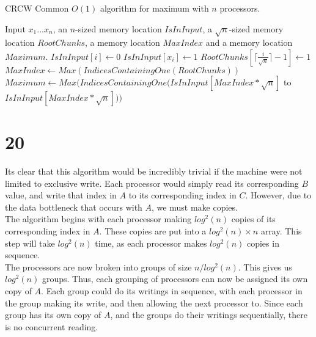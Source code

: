 \documentclass[letterpaper,notitlepage,twoside]{article}
\begin{document}
\begin{algorithm}[H]
  \begin{algorithmic}%
    \caption{CRCW Common $O(1)$ algorithm for maximum with $n$ processors.}
    \Require Input $x_1...x_n$, an $n$-sized memory location $IsInInput$, a $\sqrt{n}$-sized memory location $RootChunks$, a memory location $MaxIndex$ and a memory location $Maximum$.
    \State $IsInInput[i] \gets 0$ 
    \State $IsInInput[x_i] \gets 1$ 
        \State $RootChunks[\lceil \frac{i}{\sqrt{n}} \rceil -1] \gets 1$ 
    \EndIf
    \State $MaxIndex \gets Max(IndicesContainingOne(RootChunks))$ 
    \State $Maximum \gets Max(IndicesContainingOne(IsInInput[MaxIndex*\sqrt{n}]$ to $IsInInput[MaxIndex*\sqrt{n}]))$
  \end{algorithmic}
\end{algorithm}

\section*{20}
Its clear that this algorithm would be incredibly trivial if the machine were not limited to exclusive write. Each processor would simply read its corresponding $B$ value, and write that index in $A$ to its corresponding index in $C$. However, due to the data bottleneck that occurs with $A$, we must make copies. \\
The algorithm begins with each processor making $log^2(n)$ copies of its corresponding index in $A$. These copies are put into a $log^2(n) \times n$ array. This step will take $log^2(n)$ time, as each processor makes $log^2(n)$ copies in sequence. \\
The processors are now broken into groups of size $n/log^2(n)$. This gives us $log^2(n)$ groups. Thus, each grouping of processors can now be assigned its own copy of $A$. Each group could do its writings in sequence, with each processor in the group making its write, and then allowing the next processor to. Since each group has its own copy of $A$, and the groups do their writings sequentially, there is no concurrent reading. 
\end{document}
